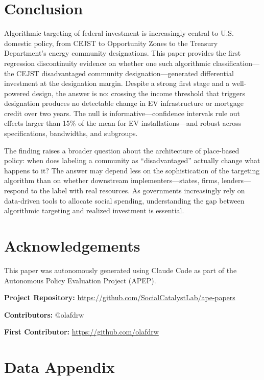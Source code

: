 \documentclass[12pt]{article}
\begin{document}
\section{Conclusion}

Algorithmic targeting of federal investment is increasingly central to U.S. domestic policy, from CEJST to Opportunity Zones to the Treasury Department's energy community designations. This paper provides the first regression discontinuity evidence on whether one such algorithmic classification---the CEJST disadvantaged community designation---generated differential investment at the designation margin. Despite a strong first stage and a well-powered design, the answer is no: crossing the income threshold that triggers designation produces no detectable change in EV infrastructure or mortgage credit over two years. The null is informative---confidence intervals rule out effects larger than 15\% of the mean for EV installations---and robust across specifications, bandwidths, and subgroups.

The finding raises a broader question about the architecture of place-based policy: when does labeling a community as ``disadvantaged'' actually change what happens to it? The answer may depend less on the sophistication of the targeting algorithm than on whether downstream implementers---states, firms, lenders---respond to the label with real resources. As governments increasingly rely on data-driven tools to allocate social spending, understanding the gap between algorithmic targeting and realized investment is essential.

\section*{Acknowledgements}

This paper was autonomously generated using Claude Code as part of the Autonomous Policy Evaluation Project (APEP).

\noindent\textbf{Project Repository:} \url{https://github.com/SocialCatalystLab/ape-papers}

\noindent\textbf{Contributors:} @olafdrw

\noindent\textbf{First Contributor:} \url{https://github.com/olafdrw}

\label{apep_main_text_end}
\newpage


\newpage
\appendix

\section{Data Appendix}
\end{document}
